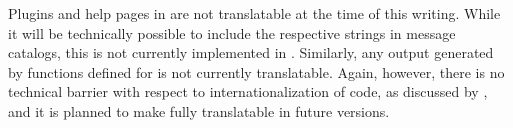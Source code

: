 Plugins and help pages in  are not translatable at the time of this
writing. While it will be technically possible to include the respective strings in
message catalogs, this is not currently implemented in . Similarly, any
output generated by  functions defined for  is not currently
translatable. Again, however, there is no technical barrier with respect to
internationalization of  code, as discussed by \cite{Ripley2005a},
and it is planned to make  fully translatable in future versions.
